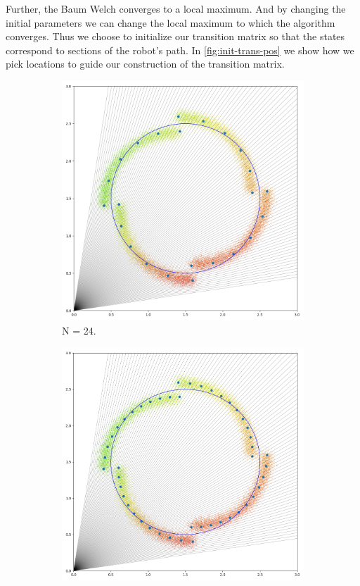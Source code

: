 \documentclass[twoside]{article}
\begin{document}
Further, the Baum Welch converges to a local maximum.
And by changing the initial parameters we can change the local maximum to which the algorithm converges.
Thus we choose to initialize our transition matrix so that the states correspond to sections of the robot's path.
In \cref{fig:init-trans-pos} we show how we pick locations to guide our construction of the transition matrix.
\begin{figure}[h]
  \centering
  \begin{subfigure}[h]{0.48\textwidth}
    \includegraphics[width=\textwidth]{images/init-states-24}
    \caption{N = 24.}\label{fig:24-states}
  \end{subfigure}
  \begin{subfigure}[h]{0.48\textwidth}
    \includegraphics[width=\textwidth]{images/init-states-48}

\end{subfigure}
\end{figure}
\end{document}
